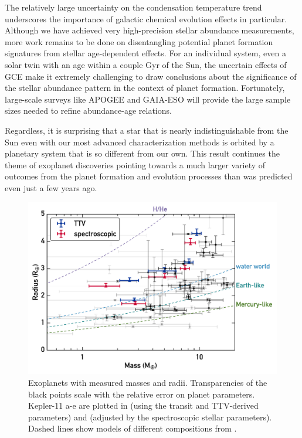 \documentclass[twocolumn,trackchanges]{aastex61}
\begin{document}
The relatively large uncertainty on the condensation temperature trend underscores the importance of galactic chemical evolution effects in particular. Although we have achieved very high-precision stellar abundance measurements, more work remains to be done on disentangling potential planet formation signatures from stellar age-dependent effects. For an individual system, even a solar twin with an age within a couple Gyr of the Sun, the uncertain effects of GCE make it extremely challenging to draw conclusions about the significance of the stellar abundance pattern in the context of planet formation. Fortunately, large-scale surveys like APOGEE and GAIA-ESO will provide the large sample sizes needed to refine  abundance-age relations.

Regardless, it is surprising that a star that is nearly indistinguishable from the Sun even with our most advanced characterization methods is orbited by a planetary system that is so different from our own. This result continues the theme of exoplanet discoveries pointing towards a much larger variety of outcomes from the planet formation and evolution processes than was predicted even just a few years ago.

\begin{figure}
\centering
\includegraphics[scale=0.6]{K11_massradius}
\caption{Exoplanets with measured masses and radii. Transparencies of the black points scale with the relative error on planet parameters. Kepler-11 a-e are plotted in  (using the transit and TTV-derived parameters) and  (adjusted by the spectroscopic stellar parameters). Dashed lines show models of different compositions from \citet{Seager2007}.}
\label{fig:mr}
\end{figure}
\end{document}

